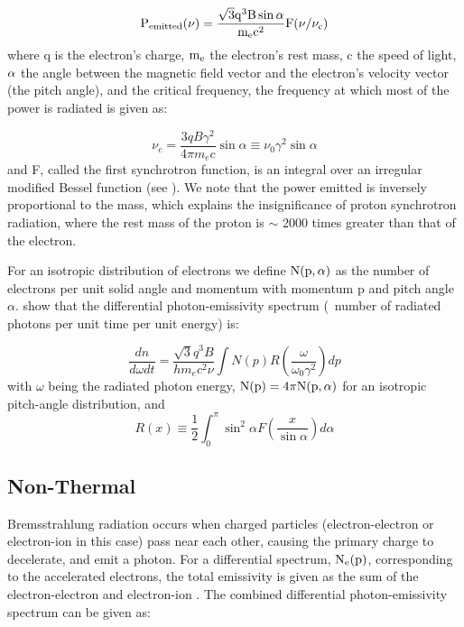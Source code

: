 \begin{equation}\label{eq:syncPow}
{\rm P_{emitted}(\nu) = 
\frac{\sqrt{3} q^3 B \sin\alpha}{m_e c^2} F(\nu/\nu_c) }
\end{equation}
where q is the electron's charge,  ${\rm m_e}$ the electron's rest mass, c the speed of light,  ${\rm \alpha }$ the angle between the magnetic field vector and the electron's velocity vector (the pitch angle), and the critical frequency, the frequency at which most of the power is radiated is given as:

\begin{equation}\label{eq:nuCrit}
\nu_c = \frac{3q B \gamma^2}{4\pi m_e c} 
\sin\alpha \equiv \nu_0 \gamma^2 \sin\alpha
\end{equation}
and F, called the first synchrotron function, is an integral over an irregular modified Bessel function (see \cite{Rybicki86}). We note that the power emitted is inversely proportional to the mass, which explains the insignificance of proton synchrotron radiation, where the rest mass of the proton is $\sim$ 2000 times greater than that of the electron.

For an isotropic distribution of electrons we define  ${\rm N(p,\alpha)}$ as the number of electrons per unit solid angle and momentum with momentum p and pitch angle $\alpha$. \cite{Houck06} show that the differential photon-emissivity spectrum (\ie{}\ number of radiated photons per unit time per unit energy) is:

\begin{equation}
\frac{d n}{d \omega d t} =
\frac{\sqrt{3}q^3 B}{h m_e c^2 \nu}
\int
N(p)
R \left(\frac{\omega}{\omega_0 \gamma^2}\right)dp
\end{equation}
with $\omega$ being the radiated photon energy, ${\rm N(p) = 4\pi N(p,\alpha)}$ for an isotropic pitch-angle distribution, and
\begin{equation}
R(x) \equiv \frac{1}{2} \int_0^\pi
\sin^2 \alpha
F\left(\frac{x}{\sin\alpha}\right) d \alpha 
\end{equation}


\subsection{Non-Thermal \brems{}}\label{gamAstr:bremss}
Bremsstrahlung radiation occurs when charged particles (electron-electron or electron-ion in this case) pass near each other, causing the  primary charge to decelerate, and emit a photon. For a differential spectrum, ${\rm N_e(p)}$, corresponding to the accelerated electrons, the total emissivity is given as the sum of the electron-electron and electron-ion \brems{}. The combined differential photon-emissivity spectrum can be given as:

